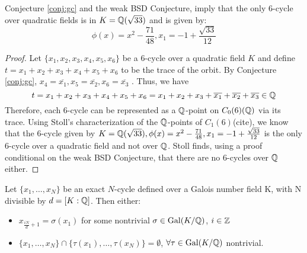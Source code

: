 \begin{corollary}
  \label {cor:6-cycles}
  Conjecture \ref{conj:gc} and the weak BSD Conjecture, imply that the
  only 6-cycle over quadratic fields is in $K = \mathbb{Q}(\sqrt{33})$ and is
  given by:
  \[
  \phi(x) = x^2 - \frac{71}{48}, x_1 = -1 + \frac{\sqrt{33}}{12}
  \]
\end{corollary}

\begin{proof}
  Let $\{x_1, x_2, x_3, x_4, x_5, x_6\}$ be a $6$-cycle over a
  quadratic field $K$ and define $t = x_1 + x_2 + x_3 + x_4 + x_5 +
  x_6$ to be the trace of the orbit. By Conjecture \ref{conj:gc}, $x_4
  = \overline{x_1}, x_5 = \overline{x_2}, x_6 = \overline{x_3}$
  . Thus, we have
  \[
  t = x_1 + x_2 + x_3 + x_4 + x_5 + x_6 = x_1 + x_2 + x_3 +
  \overline{x_1} + \overline{x_2} + \overline{x_3} \in \mathbb{Q}
  \]
  Therefore, each 6-cycle can be represented as a $\mathbb{Q}$-point on $C_0
  (6)(\mathbb{Q})$ via its trace. Using Stoll's characterization of the
  $\mathbb{Q}$-points of $C_1(6)$(cite), we know that the 6-cycle given by $K
  = \mathbb{Q}(\sqrt{33}), \phi(x) = x^2 - \frac{71}{48}, x_1 = -1 +
  \frac{\sqrt{33}}{12}$ is the only 6-cycle over a quadratic field and
  not over $\mathbb{Q}$.  Stoll finds, using a proof conditional on the weak
  BSD Conjecture, that there are no 6-cycles over $\mathbb{Q}$ either.
\end{proof}

\begin{lemma}
	Let $\{x_1, \ldots, x_{N}\}$ be an exact $N$-cycle defined over
	a Galois number field K, with N divisible by	$d = [K:\mathbb{Q} ]$. Then either: \\
	\begin{itemize}
	\item $x_{\frac{iN}{d}+1} = \sigma(x_1)$ for some nontrivial $\sigma \in
	\mathrm{Gal}(K/\mathbb{Q})$, $i \in \mathbb{Z}$
	\item $\{x_1, \ldots, x_{N}\} \cap \{\tau(x_1), \ldots, \tau(x_{N})\} =
	\emptyset$, $\forall \tau \in \mathrm{Gal}(K/\mathbb{Q})$ nontrivial.
	\end{itemize}
\end{lemma}

